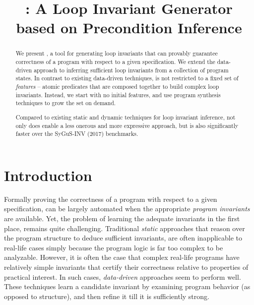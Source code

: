 \documentclass[conference]{IEEEtran}
\begin{document}
\title{\LoopInvGen: A Loop Invariant Generator \\ based on Precondition Inference}

\author{
\and
{}
}




\maketitle

\begin{abstract}
We present \LoopInvGen, a tool for generating loop invariants that can provably guarantee correctness of a program
with respect to a given specification.
We extend the data-driven approach to inferring sufficient loop invariants from a collection of program states.
In contrast to existing data-driven techniques, \LoopInvGen is not restricted to a fixed set of \emph{features} --
atomic predicates that are composed together to build complex loop invariants.
Instead, we start with no initial features, and use program synthesis techniques to grow the set on demand.

Compared to existing static and dynamic techniques for loop invariant inference,
not only does \LoopInvGen enable a less onerous and more expressive approach,
but is also significantly faster over the SyGuS-INV (2017) benchmarks.
\end{abstract}




\section{Introduction} \label{subsec:Introduction}

\noindent
Formally proving the correctness of a program with respect to a given specification,
can be largely automated when the appropriate \emph{program invariants} are available.
Yet, the problem of learning the adequate invariants in the first place, remains quite challenging.
Traditional \emph{static} approaches that reason over the program structure to deduce sufficient invariants,
are often inapplicable to real-life cases simply because the program logic is far too complex to be analyzable.
However, it is often the case that complex real-life programs have relatively simple invariants
that certify their correctness relative to properties of practical interest.
In such cases, \emph{data-driven} approaches seem to perform well.
These techniques learn a candidate invariant by examining program behavior (as opposed to structure),
and then refine it till it is sufficiently strong.
\end{document}
